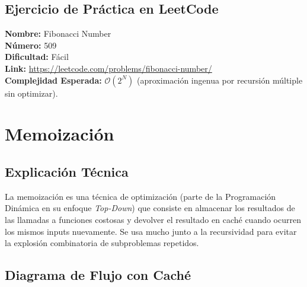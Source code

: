 \documentclass[12pt]{article}
\begin{document}
\subsection{Ejercicio de Práctica en LeetCode}
\textbf{Nombre:} Fibonacci Number \\
\textbf{Número:} 509 \\
\textbf{Dificultad:} Fácil \\
\textbf{Link:} \url{https://leetcode.com/problems/fibonacci-number/} \\
\textbf{Complejidad Esperada:} $\mathcal{O}(2^N)$ (aproximación ingenua por recursión múltiple sin optimizar).

\newpage
\section{Memoización}
\subsection{Explicación Técnica}
La memoización es una técnica de optimización (parte de la Programación Dinámica en su enfoque \textit{Top-Down}) que consiste en almacenar los resultados de las llamadas a funciones costosas y devolver el resultado en caché cuando ocurren los mismos inputs nuevamente. Se usa mucho junto a la recursividad para evitar la explosión combinatoria de subproblemas repetidos.

\subsection{Diagrama de Flujo con Caché}
\begin{center}
\end{center}
\end{document}
